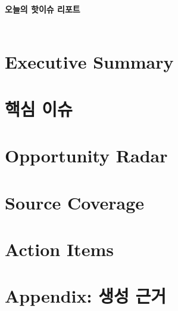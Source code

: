 \documentclass[11pt,a4paper]{article}
\begin{document}
\begin{center}
  {\Huge\bfseries 오늘의 핫이슈 리포트}\\[4pt]
  {\large {}}\\[6pt]
  \colorbox{ZeusOSLight}{\parbox{0.92\linewidth}{\centering {}}}
\end{center}
\vspace{0.8em}
\section*{Executive Summary}
\section*{핵심 이슈}
\section*{Opportunity Radar}
\section*{Source Coverage}
\section*{Action Items}
\section*{Appendix: 생성 근거}
\end{document}

